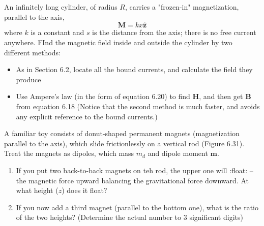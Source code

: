 \documentclass{homework}
\newcommand{\bs}[1]{\ensuremath{\boldsymbol{#1}}}
\newcommand{\bhat}[1]{\ensuremath{\boldsymbol{\hat{#1}}}}
\begin{document}
\begin{homeworkProblem}[Problem 6.12]

  An infinitely long cylinder, of radius $R$, carries a "frozen-in" magnetization, parallel to the axis, $$\bs{M} = kx \bhat{z}$$ where $k$ is a constant and $s$ is the distance from the axis; there is no free current anywhere. FInd the magnetic field inside and outside the cylinder by two different methods:

  \begin{itemize}
    \item As in Section 6.2, locate all the bound currents, and calculate the field they produce
    \item Use Ampere's law (in the form of equation 6.20) to find \bs{H}, and then get \bs{B} from equation 6.18 (Notice that the second method is much faster, and avoids any explicit reference to the bound currents.)
  \end{itemize}

  \vspace{.2in}

  \problemAnswer{ %



  }
\end{homeworkProblem}

\begin{homeworkProblem}[Problem 6.23]

  A familiar toy consists of donut-shaped permanent magnets (magnetization parallel to the axis), which slide frictionlessly on a vertical rod (Figure 6.31). Treat the magnets as dipoles, which mass $m_d$ and dipole moment \bs{m}.

  \begin{enumerate}
    \item If you put two back-to-back magnets on teh rod, the upper one will :float: -- the magnetic force upward balancing the gravitational force downward. At what height ($z$) does it float?
    \item If you now add a third magnet (parallel to the bottom one), what is the ratio of the two heights? (Determine the actual number to 3 significant digits)
  \end{enumerate}

  \vspace{.2in}

  \problemAnswer{ %



  }
\end{homeworkProblem}
\end{document}

